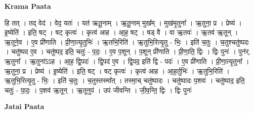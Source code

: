 \documentclass[17pt]{extarticle}
\begin{document}
\textbf{Krama Paata} \newline

हि तत् । तद् वेद॑ । वेद॒ यतः॑ । यत॑ ऋतू॒नाम् । ऋ॒तू॒नाम् मुख᳚म् । मुख॑मृ॒तुना᳚ । ऋ॒तुना॒ प्र । प्रेष्य॑ । इ॒ष्येति॑ । इति॒ षट् । षट् कृत्वः॑ । कृत्व॑ आह । आ॒ह॒ षट् । षड् वै । वा ऋ॒तवः॑ । ऋ॒तव॑ ऋ॒तून् । ऋ॒तूने॒व । ए॒व प्री॑णाति । प्री॒णा॒त्यृ॒तुभिः॑ । ऋ॒तभि॒रिति॑ । ऋ॒तुभि॒रित्यृ॒तु - भिः॒ । इति॑ च॒तुः । च॒तुश्चतु॑ष्पदः । चतु॑ष्पद ए॒व । चतु॑ष्पद॒ इति॒ चतुः॑ - प॒दः॒ । ए॒व प॒शून् । प॒शून् प्री॑णाति । प्री॒णा॒ति॒ द्विः । द्विः पुनः॑ । पुन॑र्. ऋ॒तुना᳚ । ऋ॒तुना॑ऽऽह । आ॒ह॒ द्वि॒पदः॑ । द्वि॒पद॑ ए॒व । द्वि॒पद॒ इति॑ द्वि - पदः॑ । ए॒व प्री॑णाति । प्री॒णा॒त्यृ॒तुना᳚ । ऋ॒तुना॒ प्र । प्रेष्य॑ । इ॒ष्येति॑ । इति॒ षट् । षट् कृत्वः॑ । कृत्व॑ आह । आ॒ह॒र्तुभिः॑ । ऋ॒तुभि॒रिति॑ । ऋ॒तुभि॒रित्यृ॒तु - भिः॒ । इति॑ च॒तुः । च॒तुस्तस्मा᳚त् । तस्मा॒च् चतु॑ष्पादः । चतु॑ष्पादः प॒शवः॑ । चतु॑ष्पाद॒ इति॒ चतुः॑ - पा॒दः॒ । प॒शव॑ ऋ॒तून् । ऋ॒तूनुप॑ । उप॑ जीवन्ति । जी॒व॒न्ति॒ द्विः । द्विः पुनः॑ \newline

\textbf{Jatai Paata} \newline
\end{document}
